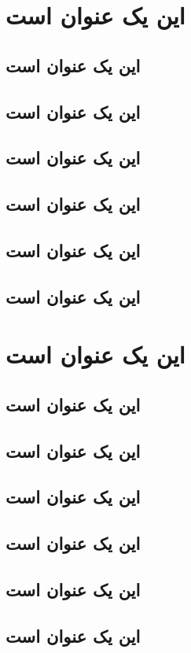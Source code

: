 \documentclass{report}
\begin{document}
\tableofcontents
\chapter{این یک عنوان است}
\section{این یک عنوان است}
\section{این یک عنوان است}
\section{این یک عنوان است}
\section{این یک عنوان است}
\section{این یک عنوان است}
\section{این یک عنوان است}
\chapter{این یک عنوان است}
\section{این یک عنوان است}
\section{این یک عنوان است}
\section{این یک عنوان است}
\section{این یک عنوان است}
\section{این یک عنوان است}
\section{این یک عنوان است}
\contentsfinish
\end{document}
